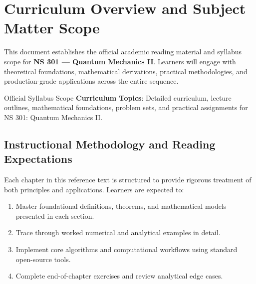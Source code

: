 \section{Curriculum Overview and Subject Matter Scope}

This document establishes the official academic reading material and syllabus scope for \textbf{NS 301 --- Quantum Mechanics II}. Learners will engage with theoretical foundations, mathematical derivations, practical methodologies, and production-grade applications across the entire sequence.

\begin{InsightBox}{Official Syllabus Scope}
  \textbf{Curriculum Topics}: Detailed curriculum, lecture outlines, mathematical foundations, problem sets, and practical assignments for NS 301: Quantum Mechanics II.
\end{InsightBox}

\subsection{Instructional Methodology and Reading Expectations}

Each chapter in this reference text is structured to provide rigorous treatment of both principles and applications. Learners are expected to:
\begin{enumerate}
  \item Master foundational definitions, theorems, and mathematical models presented in each section.
  \item Trace through worked numerical and analytical examples in detail.
  \item Implement core algorithms and computational workflows using standard open-source tools.
  \item Complete end-of-chapter exercises and review analytical edge cases.
\end{enumerate}

